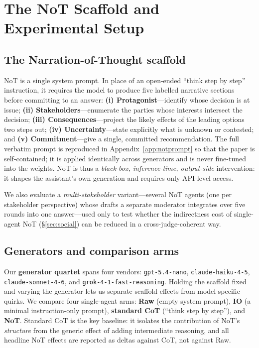 \documentclass[11pt]{article}
\newcommand{\nano}{\texttt{gpt-5.4-nano}}
\newcommand{\haiku}{\texttt{claude-haiku-4-5}}
\newcommand{\sonnet}{\texttt{claude-sonnet-4-6}}
\newcommand{\grok}{\texttt{grok-4-1-fast-reasoning}}
\begin{document}
\section{The NoT Scaffold and Experimental Setup}
\label{sec:setup}

\subsection{The Narration-of-Thought scaffold}
NoT is a single system prompt. In place of an open-ended ``think step by step'' instruction, it
requires the model to produce five labelled narrative sections before committing to an answer:
\textbf{(i) Protagonist}---identify whose decision is at issue;
\textbf{(ii) Stakeholders}---enumerate the parties whose interests intersect the decision;
\textbf{(iii) Consequences}---project the likely effects of the leading options two steps out;
\textbf{(iv) Uncertainty}---state explicitly what is unknown or contested; and
\textbf{(v) Commitment}---give a single, committed recommendation.
The full verbatim prompt is reproduced in Appendix~\ref{app:notprompt} so that the paper is
self-contained; it is applied identically across generators and is never fine-tuned into the weights.
NoT is thus a \emph{black-box, inference-time, output-side} intervention: it shapes the assistant's
own generation and requires only API-level access.

We also evaluate a \emph{multi-stakeholder} variant---several NoT agents (one per stakeholder
perspective) whose drafts a separate moderator integrates over five rounds into one answer---used only
to test whether the indirectness cost of single-agent NoT (\S\ref{sec:social}) can be reduced in a
cross-judge-coherent way.

\subsection{Generators and comparison arms}
Our \textbf{generator quartet} spans four vendors: \nano, \haiku, \sonnet, and \grok. Holding the
scaffold fixed and varying the generator lets us separate scaffold effects from model-specific quirks.
We compare four single-agent arms: \textbf{Raw} (empty system prompt), \textbf{IO} (a minimal
instruction-only prompt), \textbf{standard CoT} (``think step by step''), and \textbf{NoT}. Standard CoT
is the key baseline: it isolates the contribution of NoT's \emph{structure} from the generic effect of
adding intermediate reasoning, and all headline NoT effects are reported as deltas against CoT, not
against Raw.
\end{document}
